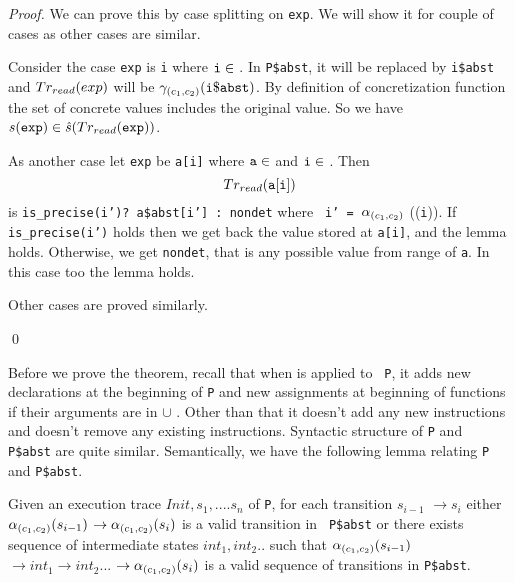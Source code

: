 \begin{proof}

We can prove this by case splitting on {\tt exp}. We will show it
for couple of cases as other cases are similar.

 Consider the case {\tt exp} is {\tt i} where \({\tt i} \in\)
 \indexids. In {\tt P\$abst}, it will be replaced by {\tt i\$abst} and
 \(Tr_{read}(exp)\) will be \(\gamma_{(c_1,c_2)}({\tt i\$abst})\). By definition of
 concretization function the set of concrete values includes the
 original value. So we have \(s({\tt exp}) \in \hat{s}(Tr_{read}({\tt exp}))\).

 As another case let {\tt exp} be {\tt a[i]} where \({\tt a} \in\)
 \arrayids{} and \({\tt i} \in\) \indexids. Then \[Tr_{read}({\tt
   a[i]})\] is {\tt is\_precise(i’)? a\$abst[i’] : nondet} where {\tt
   i’ = }\(\alpha_{(c_1,c_2)}\) (\trrd ({\tt i})). If {\tt is\_precise(i’)} holds
 then we get back the value stored at {\tt a[i]}, and the lemma
 holds. Otherwise, we get {\tt nondet}, that is any possible value
 from range of {\tt a}. In this case too the lemma holds.

 Other cases are proved similarly.
 
 \qed
  
\end{proof}



Before we prove the theorem, recall that when \tr{} is applied to {\tt
  P}, it adds new declarations at the beginning of {\tt P} and new
assignments at beginning of functions if their arguments are in
\indexids{} \(\cup\) \arrayids. Other than that it doesn’t add any new
instructions and doesn’t remove any existing
instructions. Syntactic structure of {\tt P} and {\tt
  P\$abst} are quite similar. Semantically, we have the following
lemma relating {\tt P} and {\tt P\$abst}.

\begin{lemma}
  Given an execution trace \(Init, s_1,....s_n\) of {\tt P}, for each
  transition \(s_{i-1}\) \(\rightarrow s_{i}\) either
  \(\alpha_{(c_1,c_2)}(s_{i-1})\) \(\rightarrow \alpha_{(c_1,c_2)}(s_{i})\) is a valid transition in {\tt
    P\$abst} or there exists sequence of intermediate states \(int_{1}, int_{2}..\) such that \(\alpha_{(c_1,c_2)}(s_{i-1})\)
  \(\rightarrow int_{1} \rightarrow int_{2} ...\) \(\rightarrow \alpha_{(c_1,c_2)}(s_i)\) is a valid
  sequence of transitions in {\tt P\$abst}.
\end{lemma}

